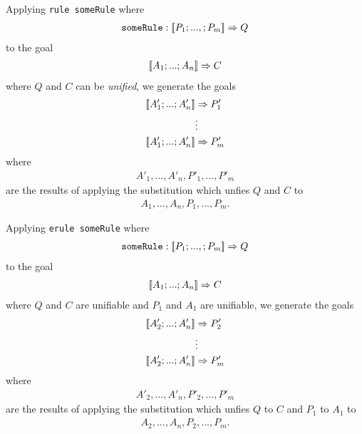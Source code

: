 \documentclass{article}
\begin{document}
\begin{definition}
	Applying \texttt{rule someRule} where
	\begin{align*}
		\texttt{someRule} : [\![P_1;...,;P_m]\!] \Rightarrow Q
	\end{align*}
	to the goal
	\begin{align*}
		[\![A_1; ...; A_n]\!] \Rightarrow C
	\end{align*}
	where $Q$ and $C$ can be \emph{unified}, we generate the goals
	\begin{align*}
		\db{A'_1; ...; A'_n} & \Rightarrow P'_1 \\
		                     & \vdots           \\
		\db{A'_1; ...; A'_n} & \Rightarrow P'_m
	\end{align*}
	where \begin{align*}
		A'_1, ..., A'_n,P'_1,...,P'_m
	\end{align*}
	are the results of applying the
	substitution which unfies $Q$ and $C$ to
	\begin{align*}
		A_1,...,A_n,P_1,...,P_m.
	\end{align*}
\end{definition}

\begin{definition}
	Applying \texttt{erule someRule} where
	\begin{align*}
		\texttt{someRule} : [\![P_1;...,;P_m]\!] \Rightarrow Q
	\end{align*}
	to the goal
	\begin{align*}
		[\![A_1; ...; A_n]\!] \Rightarrow C
	\end{align*}
	where $Q$ and $C$ are unifiable and $P_1$ and $A_1$ are unifiable, we generate the goals
	\begin{align*}
		\db{A'_2; ...; A'_n} & \Rightarrow P'_2 \\
		                     & \vdots           \\
		\db{A'_2; ...; A'_n} & \Rightarrow P'_m
	\end{align*}
	where \begin{align*}
		A'_2, ..., A'_n,P'_2,...,P'_m
	\end{align*}
	are the results of applying the
	substitution which unfies $Q$ to $C$ and $P_1$ to $A_1$ to
	\begin{align*}
		A_2,...,A_n,P_2,...,P_m.
	\end{align*}
\end{definition}
\end{document}
